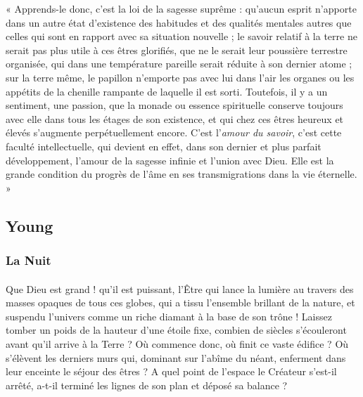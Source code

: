 \documentclass[a4paper, 11pt, oneside, landscape]{article}
\begin{document}
« Apprends-le donc, c'est la loi de la sagesse suprême : qu'aucun esprit n'apporte dans un autre état d'existence des habitudes et des qualités mentales autres que celles qui sont en rapport avec sa situation nouvelle ; le savoir relatif à la terre ne serait pas plus utile à ces êtres glorifiés, que ne le serait leur poussière terrestre organisée, qui dans une température pareille serait réduite à son dernier atome ; sur la terre même, le papillon n'emporte pas avec lui dans l'air les organes ou les appétits de la chenille rampante de laquelle il est sorti. Toutefois, il y a un sentiment, une passion, que la monade ou essence spirituelle conserve toujours avec elle dans tous les étages de son existence, et qui chez ces êtres heureux et élevés s'augmente perpétuellement encore. C'est l'\emph{amour du savoir}, c'est cette faculté intellectuelle, qui devient en effet, dans son dernier et plus parfait développement, l'amour de la sagesse infinie et l'union avec Dieu. Elle est la grande condition du progrès de l'âme en ses transmigrations dans la vie éternelle. »
\clearpage
\subsection{Young}
\subsubsection{La Nuit}
\paragraph{}
Que Dieu est grand ! qu'il est puissant, l'Être qui lance la lumière au travers des masses opaques de tous ces globes, qui a tissu l'ensemble brillant de la nature, et suspendu l'univers comme un riche diamant à la base de son trône ! Laissez tomber un poids de la hauteur d'une étoile fixe, combien de siècles s'écouleront avant qu'il arrive à la Terre ? Où commence donc, où finit ce vaste édifice ? Où s'élèvent les derniers murs qui, dominant sur l'abîme du néant, enferment dans leur enceinte le séjour des êtres ? A quel point de l'espace le Créateur s'est-il arrêté, a-t-il terminé les lignes de son plan et déposé sa balance ?
\end{document}
